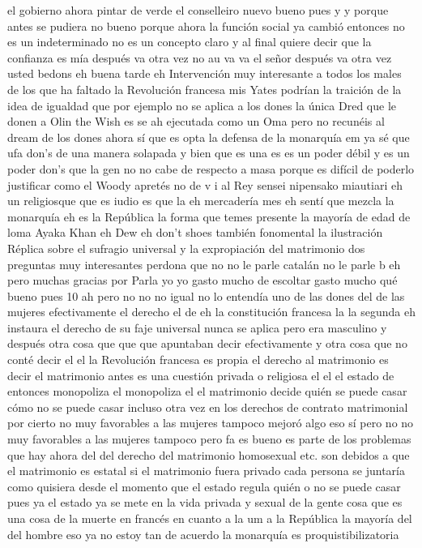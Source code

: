 el gobierno ahora pintar de verde el conselleiro nuevo bueno pues y y porque antes se pudiera no
bueno porque ahora la función social ya cambió entonces no es un indeterminado no es un concepto claro
y al final quiere decir que la confianza es mía después va otra vez no au va
va el señor después va otra vez usted bedons eh buena tarde eh
Intervención
muy interesante a todos los males de los que ha faltado la Revolución francesa mis Yates podrían
la traición de la idea de igualdad que por ejemplo no se aplica a los dones la única Dred que le donen a Olin the Wish es
se ah ejecutada como un Oma pero no recunéis al dream de los dones ahora sí que es opta la defensa de la monarquía em
ya sé que ufa don's de una manera solapada y bien que es una es es un poder débil y es un poder don's que la gen no
no cabe de respecto a masa porque es difícil de poderlo justificar como el Woody apretés no de v i al Rey sensei nipensako miautiari
eh un religiosque que es iudio es que la eh mercadería mes eh sentí que mezcla la monarquía eh es la República
la forma que temes presente la mayoría de edad de loma Ayaka Khan eh Dew
eh don't shoes también fonomental la ilustración
Réplica sobre el sufragio universal y la expropiación del matrimonio
dos preguntas muy interesantes perdona que no no le parle catalán no le parle b eh pero muchas gracias por Parla
yo yo gasto mucho de escoltar gasto mucho qué bueno pues 10 ah pero no no no igual no lo entendía
uno de las dones del de las mujeres efectivamente el derecho el de eh
la constitución francesa la la segunda eh instaura el derecho de su faje universal nunca se aplica pero era masculino
y después otra cosa que que que apuntaban decir efectivamente y otra cosa que no conté decir el
el la Revolución francesa es propia el derecho al matrimonio es decir el matrimonio antes es una cuestión privada o religiosa
el el el estado de entonces monopoliza el monopoliza el
el matrimonio decide quién se puede casar cómo no se puede casar incluso otra vez en los derechos de contrato matrimonial por cierto no muy favorables a las mujeres
tampoco mejoró algo eso sí pero no no muy favorables a las mujeres tampoco pero fa es bueno
es parte de los problemas que hay ahora del del derecho del matrimonio homosexual etc. son debidos a que el matrimonio es estatal
si el matrimonio fuera privado cada persona se juntaría como quisiera desde el momento que el estado regula quién o no se puede casar pues ya el estado
ya se mete en la vida privada y sexual de la gente cosa que es una cosa de la muerte en francés en cuanto a la um
a la República la mayoría del del hombre eso ya no estoy tan de acuerdo la monarquía es proquistibilizatoria
